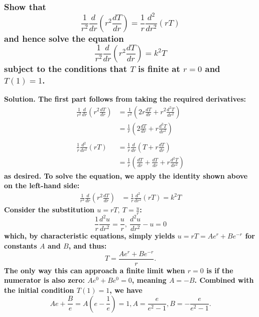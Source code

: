 \documentclass{article}
\begin{document}
\subsubsection*{Show that 
\begin{equation*}
    \frac{1}{r^2}\frac{d}{dr}(r^2 \frac{dT}{dr}) = \frac{1}{r}\frac{d^2}{dr^2}(rT)
\end{equation*}
and hence solve the equation
\begin{equation*}
    \frac{1}{r^2}\frac{d}{dr}(r^2\frac{dT}{dr}) = k^2 T
\end{equation*}
subject to the conditions that $T$ is finite at $r=0$ and $T(1) = 1$.}
\bf Solution. \normalfont The first part follows from taking the required derivatives:
\begin{equation*}
    \begin{aligned}
        \frac{1}{r^2}\frac{d}{dr}(r^2\frac{dT}{dr}) &= \frac{1}{r^2}(2r\frac{dT}{dr} + r^2\frac{d^2T}{dr^2}) \\
        &= \frac{1}{r}(2\frac{dT}{dr} + r\frac{d^2T}{dr^2})\\ \\
        \frac{1}{r}\frac{d^2}{dr^2}(rT) &= \frac{1}{r}\frac{d}{dr}(T+r\frac{dT}{dr}) \\
        &= \frac{1}{r}(\frac{dT}{dr}+\frac{dT}{dr}+r\frac{d^2T}{dr^2})
    \end{aligned}
\end{equation*}
as desired.
To solve the equation, we apply the identity shown above on the left-hand side:
\begin{equation*}
    \begin{aligned}
    \frac{1}{r^2}\frac{d}{dr}(r^2\frac{dT}{dr}) &=\frac{1}{r}\frac{d^2}{dr^2}(rT) = k^2 T
    \end{aligned}
\end{equation*}
Consider the substitution $u=rT,\ T=\frac{u}{r}$:
\begin{equation*}
    \frac{1}{r}\frac{d^2u}{dr^2} = \frac{u}{r},\ \frac{d^2u}{dr^2} - u = 0
\end{equation*}
which, by characteristic equations, simply yields $u=rT=Ae^r+Be^{-r}$ for constants $A$ and $B$, and thus:
\begin{equation*}
    T=\frac{Ae^r+Be^{-r}}{r}.
\end{equation*} The only way this can approach a finite limit when $r=0$ is if the numerator is also zero: $Ae^0 + Be^0 = 0$, meaning $A = -B$. Combined with the initial condition $T(1) = 1$, we have
\begin{equation*}
    Ae + \frac{B}{e} = A(e-\frac{1}{e}) = 1, A = \frac{e}{e^2-1}, B = -\frac{e}{e^2-1}.
\end{equation*}
\end{document}
